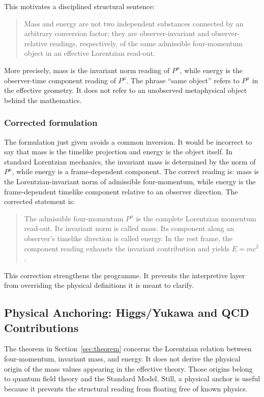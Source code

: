 \documentclass[12pt,a4paper]{article}
\theoremstyle{definition}
\theoremstyle{remark}
\begin{document}
This motivates a disciplined structural sentence:

\begin{quote}
Mass and energy are not two independent substances connected by an arbitrary conversion factor; they are observer-invariant and observer-relative readings, respectively, of the same admissible four-momentum object in an effective Lorentzian read-out.
\end{quote}

More precisely, mass is the invariant norm reading of $P^\mu$, while energy is the observer-time component reading of $P^\mu$. The phrase ``same object'' refers to $P^\mu$ in the effective geometry. It does not refer to an unobserved metaphysical object behind the mathematics.

\subsubsection{Corrected formulation}

The formulation just given avoids a common inversion. It would be incorrect to say that mass is the timelike projection and energy is the object itself. In standard Lorentzian mechanics, the invariant mass is determined by the norm of $P^\mu$, while energy is a frame-dependent component. The correct reading is: mass is the Lorentzian-invariant norm of admissible four-momentum, while energy is the frame-dependent timelike component relative to an observer direction. The corrected statement is:

\begin{quote}
The admissible four-momentum $P^\mu$ is the complete Lorentzian momentum read-out. Its invariant norm is called mass. Its component along an observer's timelike direction is called energy. In the rest frame, the component reading exhausts the invariant contribution and yields $E=mc^2$.
\end{quote}

This correction strengthens the programme. It prevents the interpretive layer from overriding the physical definitions it is meant to clarify.

\subsection{Physical Anchoring: Higgs/Yukawa and QCD Contributions}
\label{sec:physical-anchoring}

The theorem in Section~\ref{sec:theorem} concerns the Lorentzian relation between four-momentum, invariant mass, and energy. It does not derive the physical origin of the mass values appearing in the effective theory. Those origins belong to quantum field theory and the Standard Model. Still, a physical anchor is useful because it prevents the structural reading from floating free of known physics.
\end{document}
